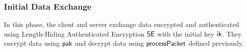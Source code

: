 \subsubsection{Initial Data Exchange}
In this phase, the client and server exchange data
encrypted and authenticated using Length-Hiding
Authenticated Encryption $\mathsf{SE}$ with the initial key $\mathsf{ik}$.
They encrypt data using $\mathsf{pak}$ and decrypt data using
$\mathsf{processPacket}$ defined previously.